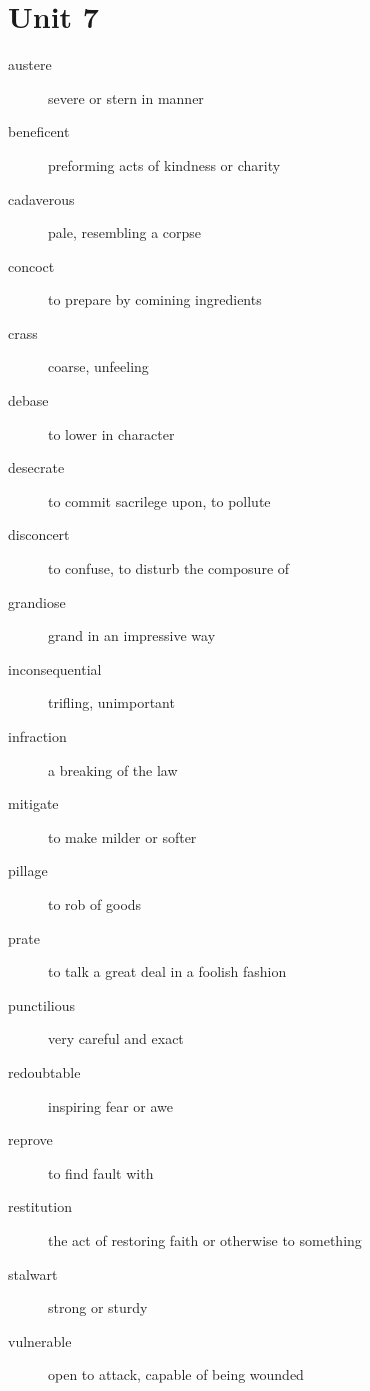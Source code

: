 \section{Unit 7}
\begin{description}
  \item[austere] severe or stern in manner
  \item[beneficent] preforming acts of kindness or charity
  \item[cadaverous] pale, resembling a corpse
  \item[concoct] to prepare by comining ingredients
  \item[crass] coarse, unfeeling
  \item[debase] to lower in character
  \item[desecrate] to commit sacrilege upon, to pollute
  \item[disconcert] to confuse, to disturb the composure of
  \item[grandiose] grand in an impressive way
  \item[inconsequential] trifling, unimportant
  \item[infraction] a breaking of the law
  \item[mitigate] to make milder or softer
  \item[pillage] to rob of goods
  \item[prate] to talk a great deal in a foolish fashion
  \item[punctilious] very careful and exact
  \item[redoubtable] inspiring fear or awe
  \item[reprove] to find fault with
  \item[restitution] the act of restoring faith or otherwise to something
  \item[stalwart] strong or sturdy
  \item[vulnerable] open to attack, capable of being wounded
\end{description}

